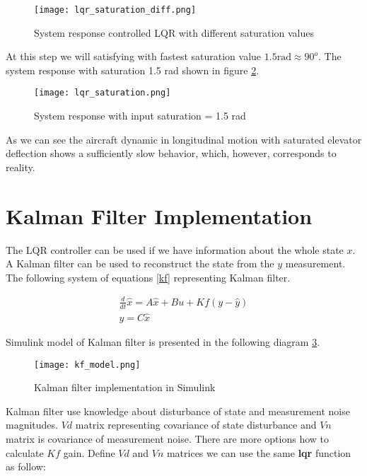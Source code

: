 \begin{figure}[h!]
    \centering
    \texttt{[image: lqr\_saturation\_diff.png]}
    \caption{System response controlled LQR with different saturation values}
    \label{fig:sat_diff}
\end{figure}

At this step we will satisfying with fastest saturation value $1.5 \text{rad} \approx 90 ^o$. The system response with saturation 1.5 rad shown in figure \ref{fig:sat}.

\begin{figure}[h!]
    \centering
    \texttt{[image: lqr\_saturation.png]}
    \caption{System response with input saturation = 1.5 rad}
    \label{fig:sat}
\end{figure}

As we can see the aircraft dynamic in longitudinal motion with saturated
elevator deflection shows a sufficiently slow behavior, which, however,
corresponds to reality.





\section{Kalman Filter Implementation}
The LQR controller can be used if we have information about the whole
state $x$. A Kalman filter can be used to reconstruct the state from the
$y$ measurement. The following system of equations \ref{kf} representing Kalman filter.

\begin{equation}\label{kf}
    \begin{split}
        \frac{d}{dt}\hat{x} = A\hat{x} + Bu + Kf(y-\hat{y})\\
        \hat{y} = C\hat{x}
    \end{split}
\end{equation}


Simulink model of Kalman filter is presented in the following diagram
\ref{fig:kf_model}.

\begin{figure}[hbt!]
    \centering
    \texttt{[image: kf\_model.png]}
    \caption{Kalman filter implementation in Simulink}
    \label{fig:kf_model}
\end{figure}

Kalman filter use knowledge  about disturbance of state and measurement
noise magnitudes. $Vd$ matrix representing covariance of state disturbance
and $Vn$ matrix is covariance of measurement noise.
There are more options how to calculate $Kf$ gain. Define $Vd$
and $Vn$ matrices we can use the same \textbf{lqr} function as follow: 

